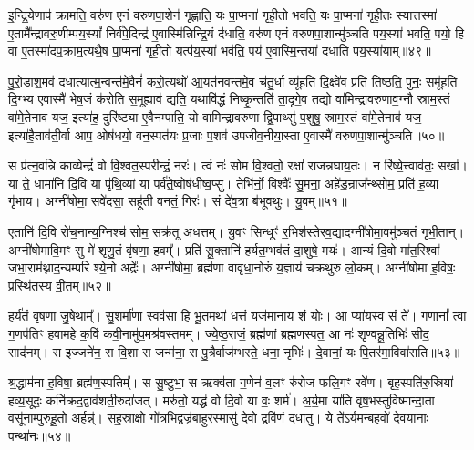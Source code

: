 इ॒न्द्रि॒येणाप॑ क्रामति॒ वरु॑ण एनं वरुणपा॒शेन॑ गृह्णाति॒ यः पा॒प्मना॑ गृही॒तो भव॑ति॒ यः पा॒प्मना॑ गृही॒तः स्यात्तस्मा॑ ए॒तामै᳚न्द्रावरु॒णीम्प॑य॒स्यां᳚ निर्व॑पे॒दिन्द्र॑ ए॒वास्मि॑न्निन्द्रि॒यं द॑धाति॒ वरु॑ण एनं वरुणपा॒शान्मु॑ञ्चति पय॒स्या॑ भवति॒ पयो॒ हि वा ए॒तस्मा॑दप॒क्राम॒त्यथै॒ष पा॒प्मना॑ गृही॒तो यत्प॑य॒स्या॑ भव॑ति॒ पय॑ ए॒वास्मि॒न्तया॑ दधाति पय॒स्या॑याम्॥४९॥

पु॒रो॒डाश॒मव॑ दधात्यात्म॒न्वन्त॑मे॒वैनं॑ करो॒त्यथो॑ आ॒यत॑नवन्तमे॒व च॑तु॒र्धा व्यू॑हति दि॒क्ष्वे॑व प्रति॑ तिष्ठति॒ पुनः॒ समू॑हति दि॒ग्भ्य ए॒वास्मै॑ भेष॒जं क॑रोति स॒मूह्याव॑ द्यति॒ यथावि॑द्धं निष्कृ॒न्तति॑ ता॒दृगे॒व तद्यो वा॑मिन्द्रावरुणाव॒ग्नौ स्राम॒स्तं वा॑मे॒तेनाव॑ यज॒ इत्या॑ह॒ दुरि॑ष्ट्या ए॒वैन॑म्पाति॒ यो वा॑मिन्द्रावरुणा द्वि॒पाथ्सु॑ प॒शुषु॒ स्राम॒स्तं वा॑मे॒तेनाव॑ यज॒ इत्या॑है॒ताव॑ती॒र्वा आप॒ ओष॑धयो॒ वन॒स्पत॑यः प्र॒जाः प॒शव॑ उपजीव॒नीया॒स्ता ए॒वास्मै॑ वरुणपा॒शान्मु॑ञ्चति॥५०॥

{\anuvakamend[{ए॒तस्य॑ पय॒स्या॑याम्पाति॒ षड्विꣳ॑शतिश्च॥13॥}]}

स प्र॑त्न॒वन्नि काव्येन्द्रं॑ वो वि॒श्वत॒स्परीन्द्रं॒ नरः॑। त्वं नः॑ सोम वि॒श्वतो॒ रक्षा॑ राजन्नघाय॒तः। न रि॑ष्ये॒त्त्वाव॑तः॒ सखा᳚। या ते॒ धामा॑नि दि॒वि या पृ॑थि॒व्यां या पर्व॑ते॒ष्वोष॑धीष्व॒प्सु। तेभि॑र्नो॒ विश्वैः᳚ सु॒मना॒ अहे॑ड॒न्राज᳚न्थ्सोम॒ प्रति॑ ह॒व्या गृ॑भाय। अग्नी॑षोमा॒ सवे॑दसा॒ सहू॑ती वनतं॒ गिरः॑। सं दे॑व॒त्रा ब॑भूवथुः। यु॒वम्॥५१॥

ए॒तानि॑ दि॒वि रो॑च॒नान्य॒ग्निश्च॑ सोम॒ सक्र॑तू अधत्तम्। यु॒वꣳ सिन्धूꣳ॑ र॒भिश॑स्तेरव॒द्यादग्नी॑षोमा॒वमु॑ञ्चतं गृभी॒तान्। अग्नी॑षोमावि॒मꣳ सु मे॑ शृणु॒तं वृ॑षणा॒ हवम्᳚। प्रति॑ सू॒क्तानि॑ हर्यत॒म्भव॑तं दा॒शुषे॒ मयः॑। आन्यं दि॒वो मा॑त॒रिश्वा॑ जभा॒राम॑थ्नाद॒न्यम्परि॑ श्ये॒नो अद्रेः᳚। अग्नी॑षोमा॒ ब्रह्म॑णा वावृधा॒नोरुं य॒ज्ञाय॑ चक्रथुरु लो॒कम्। अग्नी॑षोमा ह॒विषः॒ प्रस्थि॑तस्य वी॒तम्॥५२॥

हर्य॑तं वृषणा जु॒षेथाम्᳚। सु॒शर्मा॑णा॒ स्वव॑सा॒ हि भू॒तमथा॑ धत्तं॒ यज॑मानाय॒ शं योः। आ प्या॑यस्व॒ सं ते᳚। ग॒णानां᳚ त्वा ग॒णप॑तिꣳ हवामहे क॒विं क॑वी॒नामु॑प॒मश्र॑वस्तमम्। ज्ये॒ष्ठ॒राजं॒ ब्रह्म॑णां ब्रह्मणस्पत॒ आ नः॑ शृ॒ण्वन्नू॒तिभिः॑ सीद॒ साद॑नम्। स इज्जने॑न॒ स वि॒शा स जन्म॑ना॒ स पु॒त्रैर्वाज॑म्भरते॒ धना॒ नृभिः॑। दे॒वानां॒ यः पि॒तर॑मा॒विवा॑सति॥५३॥

श्र॒द्धाम॑ना ह॒विषा॒ ब्रह्म॑ण॒स्पतिम्᳚। स सु॒ष्टुभा॒ स ऋक्व॑ता ग॒णेन॑ व॒लꣳ रु॑रोज फलि॒गꣳ रवे॑ण। बृह॒स्पति॑रु॒स्रिया॑ हव्य॒सूदः॒ कनि॑क्रद॒द्वाव॑शती॒रुदा॑जत्। मरु॑तो॒ यद्ध॑ वो दि॒वो या वः॒ शर्म॑। अ॒र्य॒मा या॑ति वृष॒भस्तुवि॑ष्मान्दा॒ता वसू॑नाम्पुरुहू॒तो अर्\mbox{}हन्न्॑। स॒ह॒स्रा॒क्षो गो᳚त्र॒भिद्वज्र॑बाहुर॒स्मासु॑ दे॒वो द्रवि॑णं दधातु। ये ते᳚\-ऽर्यमन्ब॒हवो॑ देव॒यानाः॒ पन्था॑नः॥५४॥

